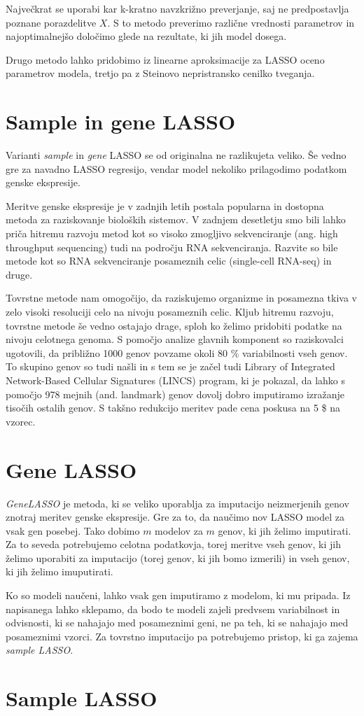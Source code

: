 \documentclass[onecolumn]{report}
\begin{document}
Največkrat se uporabi kar k-kratno navzkrižno preverjanje, saj ne predpostavlja poznane porazdelitve $X$. S to metodo preverimo različne vrednosti parametrov in najoptimalnejšo določimo glede na rezultate, ki jih model dosega. 

Drugo metodo lahko pridobimo iz linearne aproksimacije za LASSO oceno parametrov modela, tretjo pa z Steinovo nepristransko cenilko tveganja. 

\section{Sample in gene LASSO}

Varianti \emph{sample} in \emph{gene} LASSO se od originalna ne razlikujeta veliko. Še vedno gre za navadno LASSO regresijo, vendar model nekoliko prilagodimo podatkom genske ekspresije.

Meritve genske ekspresije je v zadnjih letih postala popularna in dostopna metoda za raziskovanje bioloških sistemov. V zadnjem desetletju smo bili lahko priča hitremu razvoju metod kot so visoko zmogljivo sekvenciranje (ang. high throughput sequencing) tudi na področju RNA sekvenciranja. Razvite so bile metode kot so RNA sekvenciranje posameznih celic (single-cell RNA-seq) in druge.

Tovrstne metode nam omogočijo, da raziskujemo organizme in posamezna tkiva v zelo visoki resoluciji celo na nivoju posameznih celic. Kljub hitremu razvoju, tovrstne metode še vedno ostajajo drage, sploh ko želimo pridobiti podatke na nivoju celotnega  genoma. S pomočjo analize glavnih komponent so raziskovalci ugotovili, da približno 1000 genov povzame okoli 80 \% variabilnosti vseh genov. To skupino genov so tudi našli in s tem se je začel tudi Library of Integrated Network-Based Cellular Signatures (LINCS) program, ki je pokazal, da lahko s pomočjo 978 mejnih (and. landmark) genov dovolj dobro imputiramo izražanje tisočih ostalih genov. S takšno redukcijo meritev pade cena poskusa na 5 \$ na vzorec. 

\section*{Gene LASSO}

\emph{GeneLASSO} je metoda, ki se veliko uporablja za imputacijo neizmerjenih genov znotraj meritev genske ekspresije. Gre za to, da naučimo nov LASSO model za vsak gen posebej. Tako dobimo $m$ modelov za $m$ genov, ki jih želimo imputirati. Za to seveda potrebujemo celotna podatkovja, torej meritve vseh genov, ki jih želimo uporabiti za imputacijo (torej genov, ki jih bomo izmerili) in vseh genov, ki jih želimo imuputirati. 

Ko so modeli naučeni, lahko vsak gen imputiramo z modelom, ki mu pripada. Iz napisanega lahko sklepamo, da bodo te modeli zajeli predvsem variabilnost in odvisnosti, ki se nahajajo med posameznimi geni, ne pa teh, ki se nahajajo med posameznimi vzorci. Za tovrstno imputacijo pa potrebujemo pristop, ki ga zajema \emph{sample LASSO}.

\section*{Sample LASSO}
\end{document}
